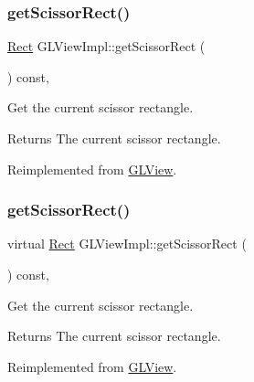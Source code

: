 \subsubsection{\texorpdfstring{get\+Scissor\+Rect()}{getScissorRect()}\hspace{0.1cm}{\footnotesize\ttfamily [1/2]}}
{\footnotesize\ttfamily \hyperlink{classRect}{Rect} G\+L\+View\+Impl\+::get\+Scissor\+Rect (\begin{DoxyParamCaption}{ }\end{DoxyParamCaption}) const\hspace{0.3cm}{\ttfamily [override]}, {\ttfamily [virtual]}}

Get the current scissor rectangle.

\begin{DoxyReturn}{Returns}
The current scissor rectangle. 
\end{DoxyReturn}


Reimplemented from \hyperlink{classGLView_a83917d65d7b496a031bfa7a7516c319c}{G\+L\+View}.

\mbox{\label{classGLViewImpl_ab6bbfe46964ec4797344ecaa4fff3b1d}} 
\subsubsection{\texorpdfstring{get\+Scissor\+Rect()}{getScissorRect()}\hspace{0.1cm}{\footnotesize\ttfamily [2/2]}}
{\footnotesize\ttfamily virtual \hyperlink{classRect}{Rect} G\+L\+View\+Impl\+::get\+Scissor\+Rect (\begin{DoxyParamCaption}{ }\end{DoxyParamCaption}) const\hspace{0.3cm}{\ttfamily [override]}, {\ttfamily [virtual]}}

Get the current scissor rectangle.

\begin{DoxyReturn}{Returns}
The current scissor rectangle. 
\end{DoxyReturn}


Reimplemented from \hyperlink{classGLView_a83917d65d7b496a031bfa7a7516c319c}{G\+L\+View}.

\mbox{\label{classGLViewImpl_a037047e04b2070c1c6d874756a978a02}} 
